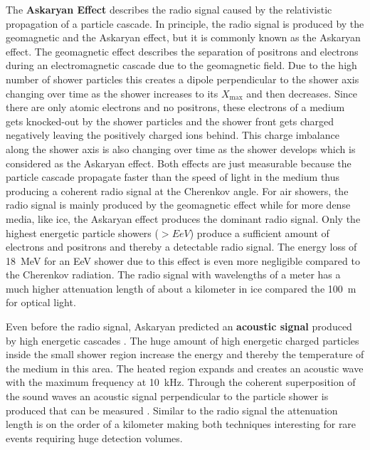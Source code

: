 The \textbf{Askaryan Effect} \cite{Askaryan62} describes the radio signal caused by the relativistic propagation of a particle cascade.
In principle, the radio signal is produced by the geomagnetic and the Askaryan effect, but it is commonly known as the Askaryan effect.
The geomagnetic effect describes the separation of positrons and electrons during an electromagnetic cascade due to the geomagnetic field.
Due to the high number of shower particles this creates a dipole perpendicular to the shower axis changing over time as the shower increases to its $X_{\text{max}}$ and then decreases.
Since there are only atomic electrons and no positrons, these electrons of a medium gets knocked-out by the shower particles and the shower front gets charged negatively leaving the positively charged ions behind.
This charge imbalance along the shower axis is also changing over time as the shower develops which is considered as the Askaryan effect.
Both effects are just measurable because the particle cascade propagate faster than the speed of light in the medium thus producing a coherent radio signal at the Cherenkov angle.
For air showers, the radio signal is mainly produced by the geomagnetic effect while for more dense media, like ice, the Askaryan effect produces the dominant radio signal.
Only the highest energetic particle showers ($>\si{EeV}$) produce a sufficient amount of electrons and positrons and thereby a detectable radio signal.
The energy loss of \SI{18}{MeV} for an EeV shower due to this effect is even more negligible compared to the Cherenkov radiation.
The radio signal with wavelengths of a meter has a much higher attenuation length of about a kilometer in ice compared the \SI{100}{m} for optical light.

Even before the radio signal, Askaryan predicted an \textbf{acoustic signal} produced by high energetic cascades \cite{Askaryan57Acoustic}.
The huge amount of high energetic charged particles inside the small shower region increase the energy and thereby the temperature of the medium in this area.
The heated region expands and creates an acoustic wave with the maximum frequency at \SI{10}{kHz}.
Through the coherent superposition of the sound waves an acoustic signal perpendicular to the particle shower is produced that can be measured \cite{Lahmann16Acustic}.
Similar to the radio signal the attenuation length is on the order of a kilometer making both techniques interesting for rare events requiring huge detection volumes.

